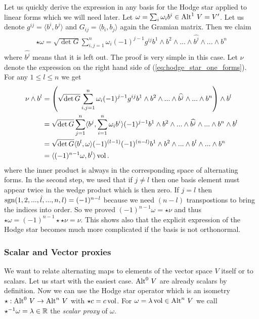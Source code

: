 \documentclass[../master_thesis.tex]{subfiles}
\begin{document}
Let us quickly derive the expression in any basis 
for the Hodge star applied to linear 
forms which we will need later. Let $\omega = \sum_i \omega_i b^i \in 
{\operatorname{Alt}^{1}\,V} = V'$. Let us denote $g^{ij} = \langle b^i, b^j \rangle$ 
and $G_{ij} = \langle b_i, b_j \rangle$ again the Gramian matrix.
Then we claim
\begin{align}
    \star \omega = \sqrt{\det G} \sum_{i,j=1}^n \omega_i (-1)^{j-1} 
        g^{ij} b^1 \wedge
        b^2 \wedge ... \wedge \widehat{b^j}\wedge ... \wedge b^n 
        \label{eq:hodge_star_one_forms}
\end{align}
where $\widehat{b^j}$ means that it is left out. The proof is very 
simple in this case. Let $\nu$ denote the expression on the right hand side 
of (\ref{eq:hodge_star_one_forms}).
For any $1 \leq l \leq n$ we get
\begin{align*}
    \nu \wedge b^l &= \left( \sqrt{\det G} \sum_{i,j=1}^n \omega_i (-1)^{j-1} g^{ij} b^1 \wedge
        b^2 \wedge ... \wedge \widehat{b^j} \wedge ... \wedge b^n\right) \wedge b^l 
    \\ &= \sqrt{\det G} \sum_{j=1}^n \langle b^j,\sum_{i=1}^n \omega_i  b^i\rangle
        (-1)^{j-1}  b^1 \wedge
        b^2 \wedge ... \wedge \widehat{b^j} \wedge ... \wedge b^n \wedge b^l
    \\ &= \sqrt{\det G} \langle b^l,\omega \rangle
        (-1)^{(l-1)}(-1)^{(n-l)}  b^1 \wedge
        b^2 \wedge ... \wedge b^l  \wedge ... \wedge b^n 
    \\ &= \langle (-1)^{n-1}\omega, b^l \rangle \operatorname{vol}.
\end{align*}
where the inner product is always in the corresponding space of alternating forms.
In the second step, we used that if $j\neq l$ then one basis element must 
appear twice in the wedge product which is then zero. If $j=l$ then 
$\operatorname{sgn} (1,2, ..., \hat{l},...,n,l) = (-1)^{n-l}$ because we need $(n-l)$
transpostions to bring the indices into order. So we proved 
$(-1)^{n-1}\omega = \star \nu$ and thus $\star \omega = (-1)^{n-1} \star\star\nu = \nu$.
This shows also that the explicit expression of the Hodge star becomes much more 
complicated if the basis is not orthonormal.


\subsubsection{Scalar and Vector proxies} \label{sec:scalar_and_vector_proxies}
We want to relate alternating maps to elements of the 
vector space $V$ itself or to scalars. Let us start with the easiest 
case. ${\operatorname{Alt}^{0}\,V}$ are already scalars by definition. Now we can use 
the Hodge star operator which is an isometry 
$\star: {\operatorname{Alt}^{0}\,V} \rightarrow {\operatorname{Alt}^{n}\,V}$ with
$\star c = c \operatorname{vol}$. 
For $\omega = \lambda \operatorname{vol} \in {\operatorname{Alt}^{n}\,V}$ we call
$\star^{-1} \omega = \lambda \in \mathbb{R}$ the \textit{scalar proxy} of $\omega$.
\end{document}
